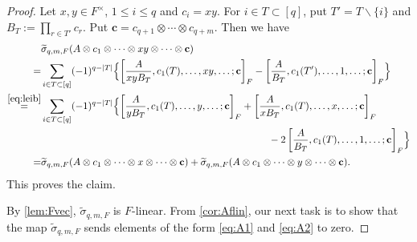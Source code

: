 \documentclass[a4paper,12pt,reqno]{amsart}
\numberwithin{equation}{section}
\theoremstyle{definition}
\newcommand{\vc}{\mathbf{c}}
\begin{document}
\begin{proof}
    Let $x,y\in F^\times$, $1\le i\leq q$ and $c_i=xy$.
    For $i\in T\subset [q]$, put $T'=T\smallsetminus\{i\}$ and  $\displaystyle B_T:=\prod_{r\in T'}c_r$.
    Put $\vc=c_{q+1}\otimes \cdots \otimes c_{q+m}$.
    Then we have
    \begin{align*}
        &\widetilde \sigma_{q,m,F}  (A\otimes  c_1\otimes \cdots \otimes xy\otimes\cdots \otimes \vc)\\
        =&\sum_{i\in T\subset[q]}(-1)^{q-|T|}\Bigl\{
        \left[
        \frac{A}{xyB_T},c_1(T),\ldots, xy,\ldots;\vc
        \right]_F
        -
        \left[
        \frac{A}{B_T},c_1(T'),\ldots,1,\ldots;\vc
        \right]_F \Bigr\}\\
        \stackrel{\eqref{eq:leib}}{=}&\sum_{i\in T\subset[q]}(-1)^{q-|T|}\Bigl\{\left[
        \frac{A}{yB_T},c_1(T),\ldots,y,\ldots;\vc
        \right]_F
        +\left[
        \frac{A}{xB_T},c_1(T),\ldots , x, \ldots;\vc
        \right]_F\\
         &\hspace{80mm}-2\left[
        \frac{A}{B_T},c_1(T),\ldots , 1, \ldots;\vc
        \right]_F \Bigr\}\\
        =&\widetilde \sigma_{q,m,F} (A\otimes  c_1\otimes \cdots \otimes x\otimes \cdots \otimes \vc)
        +\widetilde \sigma_{q,m,F}  (A\otimes  c_1\otimes \cdots \otimes  y\otimes  \cdots \otimes \vc). 
    \end{align*}
    This proves the claim.

    By \autoref{lem:Fvec}, $\widetilde \sigma_{q,m,F}$ is $F$-linear.
    From \autoref{cor:Aflin}, our next task is to show that the map $\widetilde \sigma_{q,m,F}$ sends elements of the form \eqref{eq:A1} and \eqref{eq:A2} to zero.
    
    
    


\end{proof}
\end{document}
